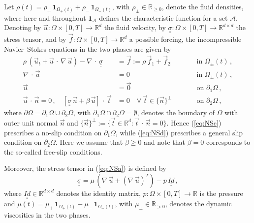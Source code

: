 \documentclass[a4paper,11pt, onecolumn]{article}
\begin{document}
\noindent Let $\rho(t) = \rho_+\,\mathbf{1}_{\Omega_+(t)} + \rho_-\,\mathbf{1}_{\Omega_-(t)}$, with $\rho_\pm \in \mathbb{R}_{\geq0}$, denote the fluid densities, where here and throughout $\mathbf{1}_{\mathcal{A}}$ defines the characteristic function for a set $\mathcal{A}$. Denoting by $\vec u : \Omega \times [0, T] \to \mathbb{R}^d$ the fluid velocity, by $\underline{\underline{\sigma}} : \Omega \times [0,T] \to \mathbb{R}^{d \times d}$ the stress tensor, and by $\vec f : \Omega \times [0, T] \to \mathbb{R}^d$ a possible forcing, the incompressible Navier--Stokes equations in the two phases are given by
\begin{subequations}
 \begin{alignat}{2}
  \rho\,(\vec u_t + \vec u \,\cdot\,\nabla\,\vec u)
  - \nabla\,\cdot\,\underline{\underline{\sigma}} & = \vec f := \rho\,\vec f_1 + \vec f_2
  \qquad &&\mbox{in } 
  \Omega_\pm(t)\,, \label{eq:NSa} \\
  \nabla\,\cdot\,\vec u & = 0 \qquad &&\mbox{in } \Omega_\pm(t)\,, \label{eq:NSb} \\
  \vec u & = \vec 0 \qquad &&\mbox{on } \partial_1\Omega\,, \label{eq:NSc} \\
  \vec u \,\cdot\,\vec{n} = 0\,,\quad
  [\underline{\underline{\sigma}}\,\vec{n} + \beta\,\vec u]\,\cdot\,\vec{t}& = 0 
  \quad\forall\ \vec{t} \in \{\vec{n}\}^\perp 
  \qquad &&\mbox{on } \partial_2\Omega\,, 
  \label{eq:NSd} 
 \end{alignat}
\end{subequations}
where $\partial\Omega =\partial_1\Omega \cup \partial_2\Omega$, with $\partial_1\Omega \cap \partial_2\Omega =\emptyset$, denotes the boundary of $\Omega$ with outer unit normal $\vec{n}$ and $\{\vec{n}\}^\perp := \{ \vec{t} \in \mathbb{R}^d : \vec{t} \,\cdot\,\vec{n} = 0\}$. Hence (\ref{eq:NSc}) prescribes a no-slip condition on $\partial_1\Omega$, while (\ref{eq:NSd}) prescribes a general slip condition on
$\partial_2\Omega$. Here we assume that $\beta \geq 0$ and note that $\beta = 0$ corresponds to the so-called free-slip conditions.

\noindent Moreover, the stress tensor in (\ref{eq:NSa}) is defined by
\begin{equation} \label{eq:sigma}
 \underline{\underline{\sigma}} = \mu \,(\nabla\,\vec u + (\nabla\,\vec u)^T) - p\,\underline{\underline{Id}}\,,
\end{equation}
where $\underline{\underline{Id}} \in \mathbb{R}^{d \times d}$ denotes the identity matrix, $p : \Omega \times [0, T] \to \mathbb{R}$ is the pressure and $\mu(t) = \mu_+\,\mathbf{1}_{\Omega_+(t)} + \mu_-\,\mathbf{1}_{\Omega_-(t)}$, with $\mu_\pm \in \mathbb{R}_{>0}$, denotes the dynamic viscosities in the two phases.
\newline
\end{document}
